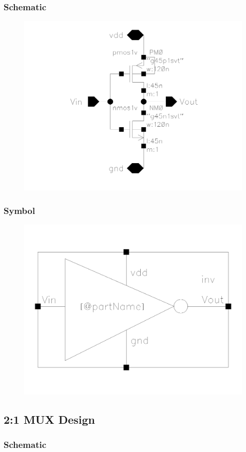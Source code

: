 \documentclass[12pt]{article}
\begin{document}
\subsubsection*{Schematic}

\begin{figure}[H]
    \centering
    \includegraphics[width=0.5\linewidth]{writeup//figures/inv_sch.png}
    \caption{}
\end{figure}

\subsubsection*{Symbol}

\begin{figure}[H]
    \centering
    \includegraphics[width=0.5\linewidth]{writeup//figures/inv_sym.png}
    \caption{}
\end{figure}

\newpage

\subsection{2:1 MUX Design}

\subsubsection*{Schematic}
\end{document}
